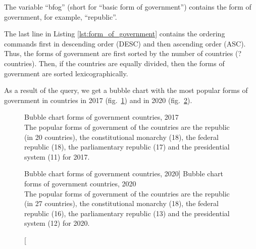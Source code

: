 
The variable ``bfog'' (short for ``basic form of government'') contains the form of government, for example, ``republic''.

The last line in Listing \ref{lst:form_of_government} contains the ordering commands first in descending order (DESC) and then ascending order (ASC). Thus, the forms of government are first sorted by the number of countries (?countries). Then, if the countries are equally divided, then the forms of government are sorted lexicographically\protect\footnotemark.



As a result of the query, we get a bubble chart with the most popular forms of government in countries in 2017 (fig.~\ref{fig:bubble_chart_forms_of_government_countries_2017}) and in 2020 (fig.~\ref{fig:bubble_chart_forms_of_government_countries_2020}).

\begin{figure}
	{
		\setlength{\fboxsep}{0pt}%
		\setlength{\fboxrule}{1pt}%
	}
	\caption[Bubble chart forms of government countries, 2017]{Bubble chart forms of government countries, 2017
		\\ The popular forms of government of the countries are the republic (in 20 countries), the constitutional monarchy (18), the federal republic (18), the parliamentary republic (17) and the presidential system (11) for 2017.
	}%
	\label{fig:bubble_chart_forms_of_government_countries_2017}%
\end{figure}

\begin{figure}
	{
		\setlength{\fboxsep}{0pt}%
		\setlength{\fboxrule}{1pt}%
	}
	\caption
	[Bubble chart forms of government countries, 2020]
	{Bubble chart forms of government countries, 2020
		\\ 
		The popular forms of government of the countries are the republic (in 27 countries), the constitutional monarchy (18), the federal republic (16), the parliamentary republic (13) and the presidential system (12) for 2020.
	}%
	\label{fig:bubble_chart_forms_of_government_countries_2020}%
\end{figure}

